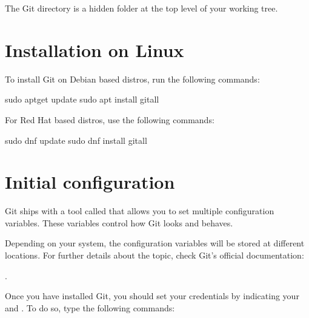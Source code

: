 \documentclass[a4paper,10pt,english,openany,oneside]{sphinxmanual}
\begin{document}
\sphinxAtStartPar
The Git directory is a hidden folder  at the top level of your working tree.


\section{Installation on Linux}
\label{\detokenize{gitinminutes:installation-on-linux}}
\sphinxAtStartPar
To install Git on Debian based distros, run the following commands:

\begin{sphinxVerbatim}[commandchars=\\\{\}]
sudo apt\PYGZhy{}get update
sudo apt install git\PYGZhy{}all
\end{sphinxVerbatim}

\sphinxAtStartPar
For Red Hat based distros, use the following commands:

\begin{sphinxVerbatim}[commandchars=\\\{\}]
sudo dnf update
sudo dnf install git\PYGZhy{}all
\end{sphinxVerbatim}


\section{Initial configuration}
\label{\detokenize{gitinminutes:initial-configuration}}
\sphinxAtStartPar
Git ships with a tool called  that allows you to set multiple configuration variables. These variables control how Git looks and behaves.

\sphinxAtStartPar
Depending on your system, the configuration variables will be stored at different locations. For further details about the topic, check Git’s official documentation: %
\begin{footnote}[7]\sphinxAtStartFootnote
{}
%
\end{footnote}.

\sphinxAtStartPar
Once you have installed Git, you should set your credentials by indicating your  and . To do so, type the following commands:
\end{document}
